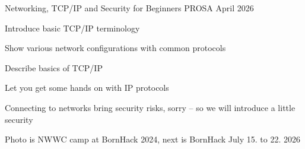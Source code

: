 \documentclass[Screen16to9,17pt]{foils}
\begin{document}


%
%
%
%
%



\mytitlepage
{Networking, TCP/IP and Security for Beginners}
{PROSA April 2026}


\hlkprofiluk



\begin{list2}
\item Introduce basic TCP/IP terminology
\item Show various network configurations with common protocols
\item Describe basics of TCP/IP
\item Let you get some hands on with IP protocols
\item Connecting to networks bring security risks, sorry -- so we will introduce a little security
\end{list2}

Photo is NWWC camp at BornHack 2024, next is BornHack July 15. to 22. 2026 
\end{document}
